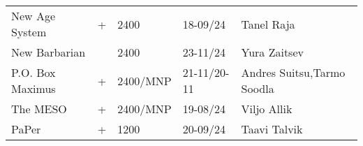 \begin{table}[ht]
\begin{tabular}{llp{2cm}p{3cm}p{4cm}}
New Age System                 & +    & 2400               & 18-09/24                                      & Tanel Raja\index[ppl]{Raja, Tanel}                  \\
New Barbarian                  &      & 2400               & 23-11/24                                      & Yura Zaitsev\index[ppl]{Zaitsev, Yura}                \\
P.O. Box Maximus               & +    & 2400/MNP           & 21-11/20-11                                   & Andres Suitsu\index[ppl]{Suitsu, Andrus},Tarmo Soodla\index[ppl]{Soodla, Tarmo}  \\
The MESO                       & +    & 2400/MNP           & 19-08/24                                      & Viljo Allik\index[ppl]{Allik, Viljo}                 \\
PaPer                          & +    & 1200               & 20-09/24                                      & Taavi Talvik\index[ppl]{Talvik, Taavi}               \\
\bottomrule
\end{tabular}
\end{table}